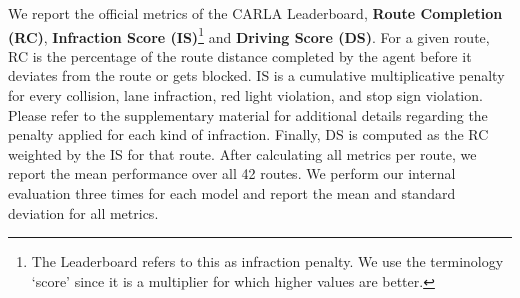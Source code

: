 We report the official metrics of the CARLA Leaderboard, \textbf{Route Completion (RC)}, \textbf{Infraction Score (IS)}\footnote{The Leaderboard refers to this as infraction penalty. We use the terminology `score' since it is a multiplier for which higher values are better.} and \textbf{Driving Score (DS)}. For a given route, RC is the percentage of the route distance completed by the agent before it deviates from the route or gets blocked. IS is a cumulative multiplicative penalty for every collision, lane infraction, red light violation, and stop sign violation. Please refer to the supplementary material for additional details regarding the penalty applied for each kind of infraction. Finally, DS is computed as the RC weighted by the IS for that route. After calculating all metrics per route, we report the mean performance over all 42 routes. We perform our internal evaluation three times for each model and report the mean and standard deviation for all metrics.


